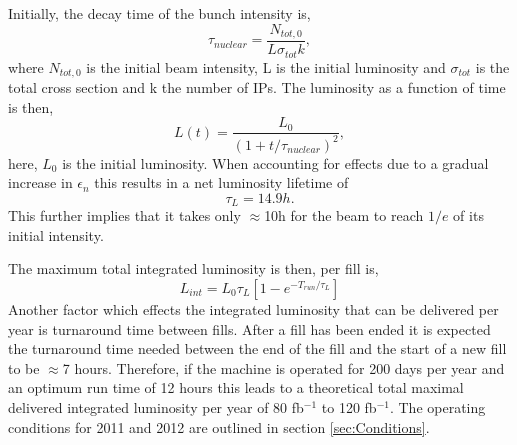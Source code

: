 Initially, the decay time of the bunch intensity is,
\begin{equation}
\tau_{nuclear}=\frac{N_{tot,0}}{L\sigma_{tot}k},
\end{equation}
where $N_{tot,0}$ is the initial beam intensity, L is the initial
luminosity and $\sigma_{tot}$ is the total cross section and 
k the number of IPs.
The luminosity as a function of time is then,
\begin{equation}
L(t)=\frac{L_{0}}{(1+t/\tau_{nuclear})^{2}},
\end{equation}
here, $L_{0}$ is the initial luminosity.
When accounting for effects due to a gradual increase in
 $\epsilon_{n}$ %
 this results in a net luminosity lifetime of 
\begin{equation}
\tau_{L} = 14.9 h .
\end{equation}
This further implies that it takes only $\approx$10h for the
beam to reach $1/e$ of its initial intensity.

The maximum total integrated luminosity is then,
per fill is,
\begin{equation}
L_{int}=L_{0}\tau_{L}\left[ 1-e^{-T_{run}/\tau_{L}}\right]
\end{equation}
Another factor which effects the integrated luminosity that can
be delivered per year is turnaround time between fills.
After a fill has been ended it is expected the turnaround time
needed between the end of the fill and the start of a new fill
to be $\approx$7 hours. Therefore, if the machine is operated for 200 days
per year and an optimum run time of 12 hours this leads to a theoretical 
total maximal delivered integrated luminosity per year of 80 fb$^{-1}$
to 120 fb$^{-1}$. The operating conditions for 2011 and 2012
are outlined in section \ref{sec:Conditions}.

